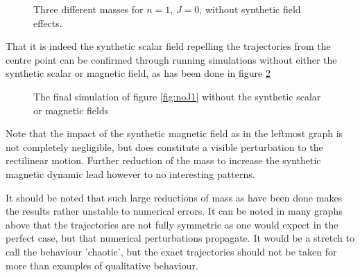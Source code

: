 \documentclass[main.tex]{subfiles}
\begin{document}
\begin{figure}[h]
    \centering
    \qquad
    \qquad
    \caption{\centering Three different masses for \(n = 1\), \(J = 0\), without synthetic field
    effects.}%
    \label{fig:noJ2}
\end{figure}

That it is indeed the synthetic scalar field repelling the trajectories from the
centre point can be confirmed through running simulations without either the synthetic
scalar or magnetic field, as has been done in figure \ref{fig:noJ3}

\begin{figure}[h]
    \centering
    \qquad
    \caption{\centering The final simulation of figure \ref{fig:noJ1} without the synthetic scalar or
    magnetic fields}%
    \label{fig:noJ3}
\end{figure}
Note that the impact of the synthetic magnetic field as in the leftmost graph is not
completely negligible, but does constitute a visible perturbation to the rectilinear
motion. Further reduction of the mass to increase the synthetic magnetic dynamic lead
however to no interesting patterns.

It should be noted that such large reductions of mass as have been done makes the
results rather unstable to numerical errors. It can be noted in many graphs above that the
trajectories are not fully symmetric as one would expect in the perfect case, but that
numerical perturbations propagate. It would be a stretch to call the behaviour 'chaotic',
but the exact trajectories should not be taken for more than examples of qualitative
behaviour.
\end{document}

